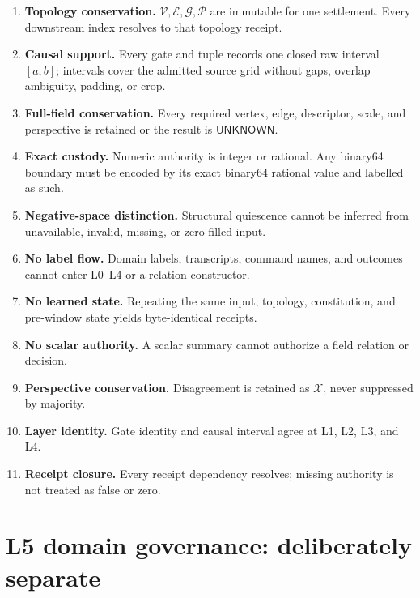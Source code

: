 \documentclass[11pt,oneside]{article}
\newcommand{\Vertices}{\mathcal{V}}
\newcommand{\Edges}{\mathcal{E}}
\newcommand{\Groups}{\mathcal{G}}
\newcommand{\Perspectives}{\mathcal{P}}
\begin{document}
\begin{enumerate}
  \item \textbf{Topology conservation.}
  \(\Vertices,\Edges,\Groups,\Perspectives\) are immutable for one settlement.
  Every downstream index resolves to that topology receipt.
  \item \textbf{Causal support.} Every gate and tuple records one closed raw
  interval \([a,b]\); intervals cover the admitted source grid without gaps,
  overlap ambiguity, padding, or crop.
  \item \textbf{Full-field conservation.} Every required vertex, edge,
  descriptor, scale, and perspective is retained or the result is
  \(\mathsf{UNKNOWN}\).
  \item \textbf{Exact custody.} Numeric authority is integer or rational.
  Any binary64 boundary must be encoded by its exact binary64 rational value
  and labelled as such.
  \item \textbf{Negative-space distinction.} Structural quiescence cannot be
  inferred from unavailable, invalid, missing, or zero-filled input.
  \item \textbf{No label flow.} Domain labels, transcripts, command names, and
  outcomes cannot enter L0--L4 or a relation constructor.
  \item \textbf{No learned state.} Repeating the same input, topology,
  constitution, and pre-window state yields byte-identical receipts.
  \item \textbf{No scalar authority.} A scalar summary cannot authorize a
  field relation or decision.
  \item \textbf{Perspective conservation.} Disagreement is retained as
  \(\mathcal{X}\), never suppressed by majority.
  \item \textbf{Layer identity.} Gate identity and causal interval agree at
  L1, L2, L3, and L4.
  \item \textbf{Receipt closure.} Every receipt dependency resolves; missing
  authority is not treated as false or zero.
\end{enumerate}

\section{L5 domain governance: deliberately separate}
\end{document}
